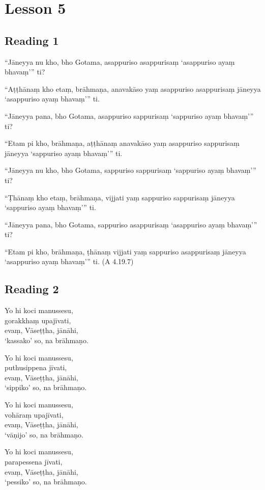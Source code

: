 \chapter{Lesson 5}

\section*{Reading 1}

“Jāneyya nu kho, bho Gotama, asappuriso asappurisaṃ ‘asappuriso ayaṃ bhavaṃ’” ti?

“Aṭṭhānaṃ kho etaṃ, brāhmaṇa, anavakāso yaṃ asappuriso asappurisaṃ jāneyya ‘asappuriso ayaṃ bhavaṃ’” ti.

“Jāneyya pana, bho Gotama, asappuriso sappurisaṃ ‘sappuriso ayaṃ bhavaṃ’” ti?

“Etam pi kho, brāhmaṇa, aṭṭhānaṃ anavakāso yaṃ asappuriso sappurisaṃ jāneyya ‘sappuriso ayaṃ bhavaṃ’” ti.

“Jāneyya nu kho, bho Gotama, sappuriso sappurisaṃ ‘sappuriso ayaṃ bhavaṃ’” ti?

“Ṭhānaṃ kho etaṃ, brāhmaṇa, vijjati yaṃ sappuriso sappurisaṃ jāneyya ‘sappuriso ayaṃ bhavaṃ’” ti.

“Jāneyya pana, bho Gotama, sappuriso asappurisaṃ ‘asappuriso ayaṃ bhavaṃ’” ti?

“Etam pi kho, brāhmaṇa, ṭhānaṃ vijjati yaṃ sappuriso asappurisaṃ jāneyya ‘asappuriso ayaṃ bhavaṃ’” ti. (A 4.19.7)

\section*{Reading 2}

Yo hi koci manussesu,\\
gorakkhaṃ upajīvati,\\
evaṃ, Vāseṭṭha, jānāhi,\\
‘kassako’ so, na brāhmaṇo.

Yo hi koci manussesu,\\
puthusippena jīvati,\\
evaṃ, Vāseṭṭha, jānāhi,\\
‘sippiko’ so, na brāhmaṇo.

Yo hi koci manussesu,\\
vohāraṃ upajīvati,\\
evaṃ, Vāseṭṭha, jānāhi,\\
‘vāṇijo’ so, na brāhmaṇo.

Yo hi koci manussesu,\\
parapessena jīvati,\\
evaṃ, Vāseṭṭha, jānāhi,\\
‘pessiko’ so, na brāhmaṇo.

